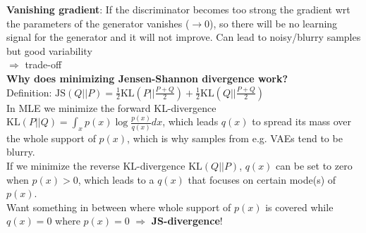 \textbf{Vanishing gradient}: If the discriminator becomes too strong the gradient wrt the parameters of the generator vanishes ($\rightarrow 0$), so there will be no learning signal for the generator and it will not improve. Can lead to noisy/blurry samples but good variability\\
$\Rightarrow$ trade-off\\
\textbf{Why does minimizing Jensen-Shannon divergence work?}\\ Definition: $\text{JS}(Q||P)=\frac{1}{2}\text{KL}(P||\frac{P+Q}{2})+\frac{1}{2}\text{KL}(Q||\frac{P+Q}{2})$\\
In MLE we minimize the forward KL-divergence $\text{KL}(P||Q)=\int_xp(x)\log\frac{p(x)}{q(x)}dx$, which leads $q(x)$ to spread its mass over the whole support of $p(x)$, which is why samples from e.g. VAEs tend to be blurry. \\
If we minimize the reverse KL-divergence $\text{KL}(Q||P)$, $q(x)$ can be set to zero when $p(x)>0$, which leads to a $q(x)$ that focuses on certain mode(s) of $p(x)$. \\
Want something in between where whole support of $p(x)$ is covered while $q(x)=0$ where $p(x)=0$ $\Rightarrow$ \textbf{JS-divergence}!
